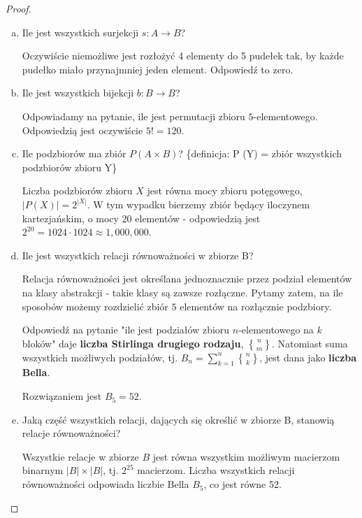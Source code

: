 \documentclass[11pt]{article}
\theoremstyle{definition}
\numberwithin{zadanie}{subsection}
\begin{document}
\begin{proof}
\begin{enumerate}[a)]
        \item Ile jest wszystkich surjekcji $s: A \to B$?

              Oczywiście niemożliwe jest rozłożyć 4 elementy do 5 pudełek tak, by każde pudełko miało przynajmniej jeden element. Odpowiedź to zero.

        \item Ile jest wszystkich bijekcji $b: B\to B$?

              Odpowiadamy na pytanie, ile jest permutacji zbioru $5$-elementowego. Odpowiedzią jest oczywiście $5! = 120$.

        \item Ile podzbiorów ma zbiór $P (A\times B)$? \{definicja: P (Y) = zbiór wszystkich podzbiorów zbioru Y\}

              Liczba podzbiorów zbioru $X$ jest równa mocy zbioru potęgowego, $|P(X)| = 2^{|X|}$. W tym wypadku bierzemy zbiór będący iloczynem kartezjańskim, o mocy 20 elementów - odpowiedzią jest $2^{20} = 1024\cdot1024\approx 1,000,000$.


        \item Ile jest wszystkich relacji równoważności w zbiorze B?

              Relacja równoważności jest określana jednoznacznie przez podział elementów na klasy abstrakcji - takie klasy są zawsze rozłączne. Pytamy zatem, na ile sposobów możemy rozdzielić zbiór $5$ elementów na rozłącznie podzbiory.

              Odpowiedź na pytanie "ile jest podziałów zbioru $n$-elementowego na $k$ bloków" daje \textbf{liczba Stirlinga drugiego rodzaju}, $n\brace m$. Natomiast suma wszystkich możliwych podziałów, tj. $B_n = \sum_{k=1}^n {n\brace k}$, jest dana jako \textbf{liczba Bella}.

              Rozwiązaniem jest $B_5 = 52$.

        \item Jaką część wszystkich relacji, dających się określić w zbiorze B, stanowią relacje równoważności?

              Wszystkie relacje w zbiorze $B$ jest równa wszystkim możliwym macierzom binarnym $|B|\times|B|$, tj. $2^{25}$ macierzom. Liczba wszystkich relacji równoważności odpowiada liczbie Bella $B_{5}$, co jest równe 52.

    \end{enumerate}

\end{proof}
\end{document}

